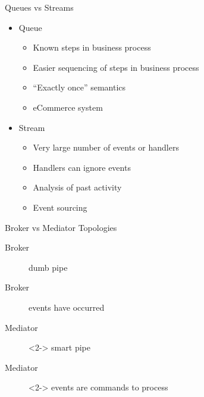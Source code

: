 \documentclass{slide}
\begin{document}
\begin{frame}{Queues vs Streams}
    \vspace{1mm}
    {\LARGE
    \begin{itemize}
        \item Queue
        \begin{itemize}
            \Large\item Known steps in business process
            \Large\item Easier sequencing of steps in business process
            \Large\item ``Exactly once'' semantics
            \Large\item eCommerce system
        \end{itemize}
        \vspace{3mm}
        \item<2-> Stream
        \begin{itemize}
            \Large\item Very large number of events or handlers
            \Large\item Handlers can ignore events
            \Large\item Analysis of past activity
            \Large\item Event sourcing
        \end{itemize}
    \end{itemize}
    }
\end{frame}

\begin{frame}{Broker vs Mediator Topologies}
    \vspace{1mm}
    {\LARGE
    \begin{description}
        \item[Broker] dumb pipe
        \vspace{3mm}
        \item[Broker] events have occurred
        \vspace{8mm}
        \item[Mediator]<2-> smart pipe
        \vspace{3mm}
        \item[Mediator]<2-> events are commands to process
    \end{description}
    }
\end{frame}
\end{document}
